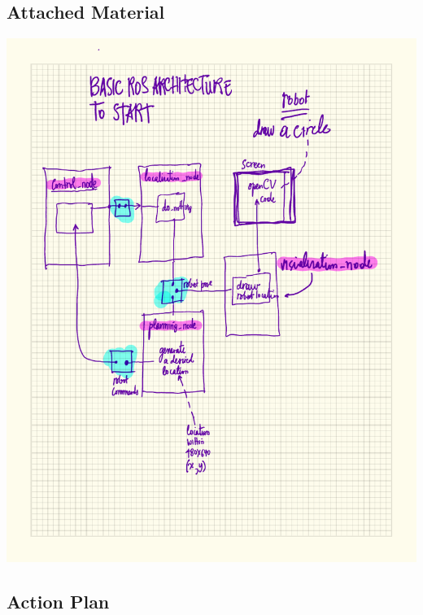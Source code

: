 \documentclass{article}
\begin{document}
\subsection{Attached Material}
\label{sec-1-3}

\includegraphics[width=.9\linewidth]{./material/eBugSwarm.pdf}

\subsection{Action Plan}
\label{sec-1-4}
\end{document}

